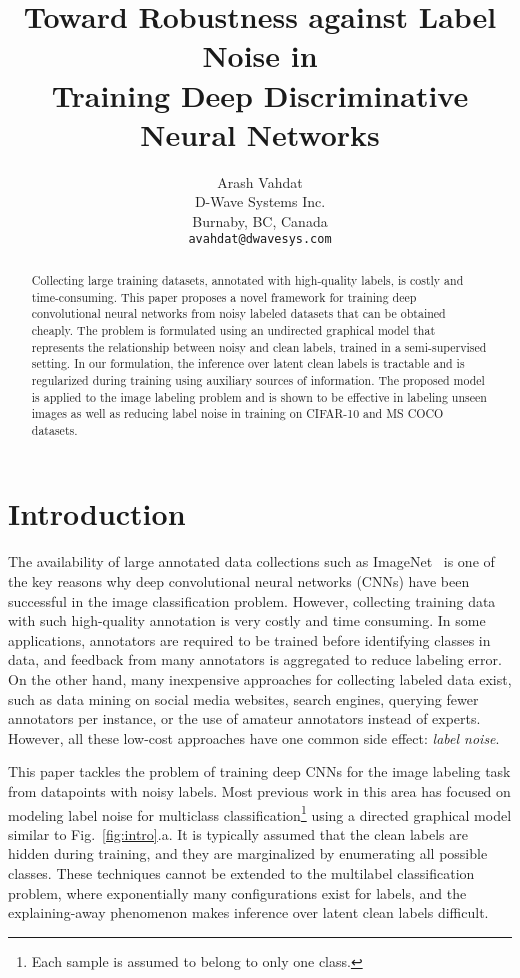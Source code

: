 \documentclass{article}
\title{Toward Robustness against Label Noise in \\ Training Deep Discriminative Neural Networks}
\author{
  Arash Vahdat
  \\
  D-Wave Systems Inc.\\
  Burnaby, BC, Canada \\
  \texttt{avahdat@dwavesys.com} \\
}
\begin{document}

\maketitle

\begin{abstract}
  Collecting large training datasets, annotated with high-quality labels, is costly and time-consuming. This paper proposes a novel framework
  for training deep convolutional neural networks from noisy labeled datasets that can be obtained cheaply. The problem is formulated using an undirected graphical model that represents
  the relationship between noisy and clean labels, trained in a semi-supervised setting.
  In our formulation, the inference over latent clean labels is tractable and 
  is regularized during training using auxiliary sources of information. The proposed model is applied to the image labeling
  problem and is shown to be effective in labeling unseen images as well as reducing label noise in training on CIFAR-10 and MS COCO datasets.
\end{abstract}


\section{Introduction}
The availability of large annotated data collections such as ImageNet~\cite{deng2009imagenet} is one of the key reasons why deep convolutional neural networks (CNNs) 
have been successful in the image classification problem. However, collecting training data with such high-quality annotation is very 
costly and time consuming. In some applications, annotators are  required to be trained before identifying classes in data, and 
feedback from many annotators is aggregated  to reduce labeling error. 
On the other hand, many inexpensive approaches for collecting labeled data exist, such as data mining on
social media websites, search engines, querying fewer annotators per instance, or the use of amateur annotators instead of experts. 
However, all these low-cost approaches have one common side effect: \textit{label noise}.

This paper tackles the problem of training deep CNNs for the image labeling task from datapoints with noisy labels. Most previous 
work in this area has focused on modeling label noise for multiclass classification\footnote{Each sample is assumed to belong to only one 
class.} using a directed graphical model similar to Fig.~\ref{fig:intro}.a. It is typically assumed that the clean labels are hidden during training, and
they are marginalized by enumerating all possible classes. These techniques cannot be extended to the multilabel classification problem, where exponentially 
many configurations exist for labels, and the explaining-away phenomenon makes inference over latent clean labels difficult.
\end{document}
